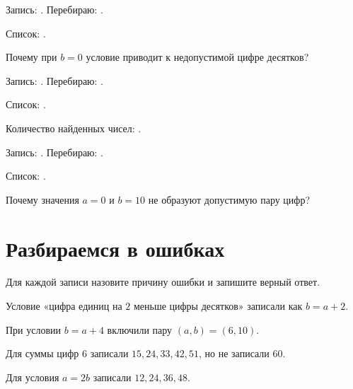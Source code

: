 \begin{practicebox}
  Запись: \answerblank[32mm]. Перебираю: \answerblank[18mm].

  Список: \answerblank[105mm].

  Почему при \(b=0\) условие приводит к недопустимой цифре десятков?
\end{practicebox}

\begin{practicebox}
  Запись: \answerblank[32mm]. Перебираю: \answerblank[18mm].

  Список: \answerblank[105mm].

  Количество найденных чисел: \answerblank[15mm].
\end{practicebox}

\begin{practicebox}
  Запись: \answerblank[32mm]. Перебираю: \answerblank[18mm].

  Список: \answerblank[105mm].

  Почему значения \(a=0\) и \(b=10\) не образуют допустимую пару цифр?
\end{practicebox}

\newpage
\section{Разбираемся в ошибках}

Для каждой записи назовите причину ошибки и запишите верный ответ.

\begin{warningbox}
  Условие «цифра единиц на \(2\) меньше цифры десятков» записали как
  \(b=a+2\).
\end{warningbox}

\begin{warningbox}
  При условии \(b=a+4\) включили пару \((a,b)=(6,10)\).
\end{warningbox}

\begin{warningbox}
  Для суммы цифр \(6\) записали \(15,24,33,42,51\), но не записали \(60\).
\end{warningbox}

\begin{warningbox}
  Для условия \(a=2b\) записали \(12,24,36,48\).
\end{warningbox}

